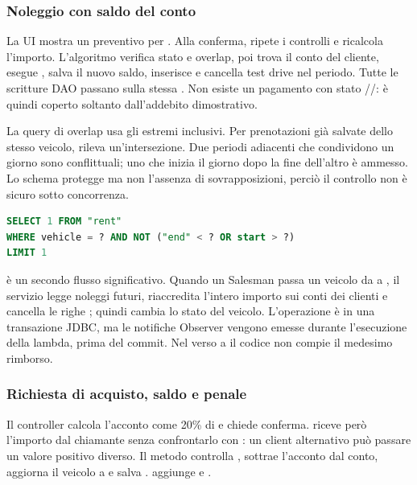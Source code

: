 \subsubsection{Noleggio con saldo del conto}
La UI mostra un preventivo per . Alla conferma,  ripete i controlli e ricalcola l'importo. L'algoritmo verifica stato  e overlap, poi trova il conto del cliente, esegue , salva il nuovo saldo, inserisce  e cancella test drive nel periodo. Tutte le scritture DAO passano sulla stessa . Non esiste un pagamento con stato //:  è quindi coperto soltanto dall'addebito dimostrativo.

La query di overlap usa gli estremi inclusivi. Per prenotazioni già salvate dello stesso veicolo,  rileva un'intersezione. Due periodi adiacenti che condividono un giorno sono conflittuali; uno che inizia il giorno dopo la fine dell'altro è ammesso. Lo schema protegge  ma non l'assenza di sovrapposizioni, perciò il controllo non è sicuro sotto concorrenza.
\begin{lstlisting}[language=SQL,caption={Predicato di overlap da \code{PostgresRentalDao.hasOverlappingRentals}.},label={lst:overlap}]
SELECT 1 FROM "rent"
WHERE vehicle = ? AND NOT ("end" < ? OR start > ?)
LIMIT 1
\end{lstlisting}

 è un secondo flusso significativo. Quando un Salesman passa un veicolo da  a , il servizio legge noleggi futuri, riaccredita l'intero importo sui conti dei clienti e cancella le righe ; quindi cambia lo stato del veicolo. L'operazione è in una transazione JDBC, ma le notifiche Observer vengono emesse durante l'esecuzione della lambda, prima del commit. Nel verso  a  il codice non compie il medesimo rimborso.

\subsubsection{Richiesta di acquisto, saldo e penale}
Il controller calcola l'acconto come 20\% di  e chiede conferma.  riceve però l'importo dal chiamante senza confrontarlo con : un client alternativo può passare un valore positivo diverso. Il metodo controlla , sottrae l'acconto dal conto, aggiorna il veicolo a  e salva .  aggiunge  e .

